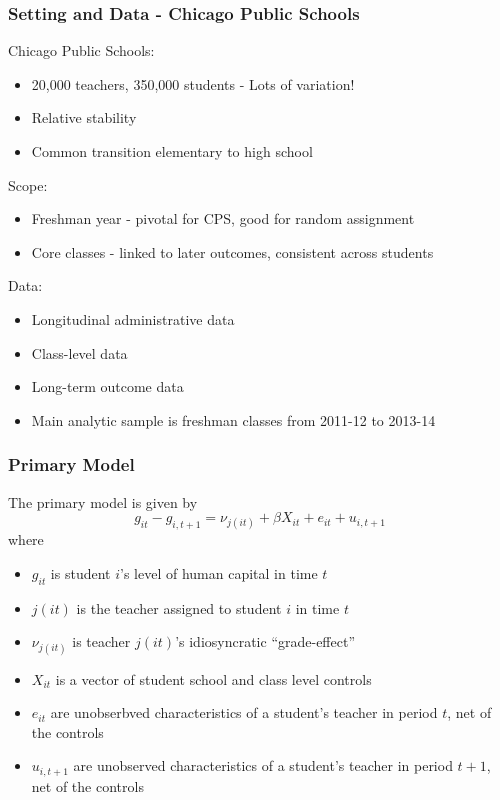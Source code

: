 \documentclass{beamer}
\begin{document}
\begin{frame}
\frametitle{Setting and Data - Chicago Public Schools}

Chicago Public Schools:
\begin{itemize}
	\item 20,000 teachers, 350,000 students - Lots of variation!
	\item Relative stability 
	\item Common transition elementary to high school 
\end{itemize}


Scope:
\begin{itemize}
	\item Freshman year - pivotal for CPS, good for random assignment 
	\item Core classes - linked to later outcomes, consistent across students 
\end{itemize}

Data:
\begin{itemize}
	\item Longitudinal administrative data 
	\item Class-level data
	\item Long-term outcome data
	\item Main analytic sample is freshman classes from 2011-12 to 2013-14
\end{itemize}
\end{frame}

\begin{frame}
\frametitle{Primary Model}

The primary model is given by
\begin{equation}
	\label{eqn:final}
	g_{it}-g_{i,t+1}=\nu_{j(it)} + \beta X_{it} + e_{it} + u_{i,t+1} 
\end{equation}
where 
\begin{itemize}
	\item $g_{it}$ is student $i$'s level of human capital in time $t$
	\item $j(it)$ is the teacher assigned to student $i$ in time $t$
	\item $\nu_{j(it)}$ is teacher $j(it)$'s idiosyncratic ``grade-effect'' 
	\item $X_{it}$ is a vector of student school and class level controls
	\item $e_{it}$ are unobserbved characteristics of a student's teacher in period $t$, net of the controls
	\item $u_{i,t+1}$ are unobserved characteristics of a student's teacher in period $t+1$, net of the controls
\end{itemize} 

\end{frame}
\end{document}

